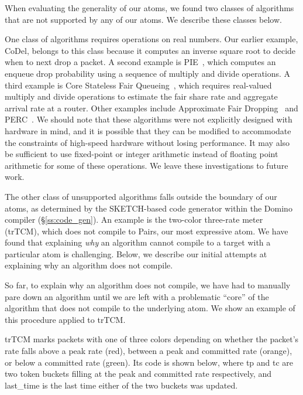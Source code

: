  When evaluating the
generality of our atoms, we found two classes of algorithms that are not
supported by any of our atoms. We describe these classes below.

One class of algorithms requires operations on real numbers.  Our earlier
example, CoDel, belongs to this class because it computes an inverse square
root to decide when to next drop a packet. A second example is PIE~\cite{pie},
which computes an enqueue drop probability using a sequence of multiply and
divide operations. A third example is Core Stateless Fair Queueing~\cite{csfq},
which requires real-valued multiply and divide operations to estimate the fair
share rate and aggregate arrival rate at a router. Other examples include
Approximate Fair Dropping~\cite{afd} and PERC~\cite{perc}. We should note that
these algorithms were not explicitly designed with hardware in mind, and it is
possible that they can be modified to accommodate the constraints of high-speed
hardware without losing performance.  It may also be sufficient to use
fixed-point or integer arithmetic instead of floating point arithmetic for some
of these operations. We leave these investigations to future work.

The other class of unsupported algorithms falls outside the boundary of
our atoms, as determined by the SKETCH-based code generator within the Domino
compiler (\S\ref{ss:code_gen}). An example is the two-color three-rate
meter~\cite{trTCM} (trTCM), which does not compile to Pairs, our most
expressive atom. We have found that explaining {\em why} an algorithm cannot
compile to a target with a particular atom is challenging.  Below, we describe
our initial attempts at explaining why an algorithm does not compile.

So far, to explain why an algorithm does not compile, we have had to manually
pare down an algorithm until we are left with a problematic ``core'' of the
algorithm that does not compile to the underlying atom. We show an example of
this procedure applied to trTCM.

trTCM marks packets with one of three colors depending on whether the packet's
rate falls above a peak rate (red), between a peak and committed rate (orange),
or below a committed rate (green). Its code is shown below, where tp and tc are
two token buckets filling at the peak and committed rate respectively, and
last\_time is the last time either of the two buckets was updated.

